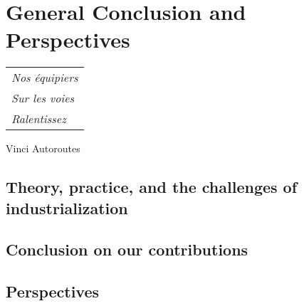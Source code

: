 
\chapter{General Conclusion and Perspectives}
\label{chapter:conclusion}

\begin{flushright}
	\begin{tabular}{@{}l@{}}
		\emph{Nos équipiers}\\
		\emph{\hspace*{1.0cm}Sur les voies}\\
		\emph{\hspace*{0.5cm}Ralentissez}\\
	\end{tabular}

	{Vinci Autoroutes}\hspace*{1cm}
\end{flushright}


\section{Theory, practice, and the challenges of industrialization}
\section{Conclusion on our contributions}
\section{Perspectives}
